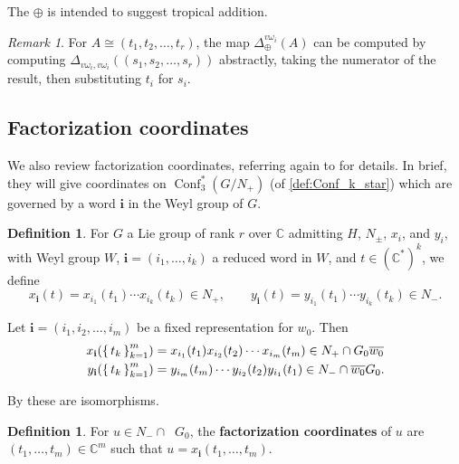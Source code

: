 \documentclass{amsart}
\theoremstyle{plain}
\theoremstyle{definition}
\newtheorem{definition}[theorem]{Definition}
\theoremstyle{remark}
\newtheorem{remark}[theorem]{Remark}
\newcommand{\defined}[1]{\textbf{#1}}
\newcommand{\fundamentalweight}{\omega}
\newcommand{\genminornumerator}[2]{\Delta_{\oplus}^{{#1} {#2}}}
\newcommand{\genminoryz}[3]{\Delta_{{#1} \fundamentalweight_{#3}, {#2}%
    \fundamentalweight_{#3}}}
\newcommand{\lifttoG}[1]{{\mathop{\overline{#1}}}}
\newcommand{\word}[1]{\mathbf{#1}}
\DeclareMathOperator{\Conf}{Conf}
\begin{document}
  The $\oplus$ is intended to suggest tropical addition.

  \begin{remark}
    \label{rem:numerator-calculation}
    For $A \cong (t_1, t_2, \dotsc, t_r)$, the map
    $\genminornumerator{v}{\fundamentalweight_i}(A)$ can be computed by
    computing $\genminoryz{v}{v}{i}((s_1, s_2, \dotsc, s_r))$
    abstractly, taking the numerator of the result, then substituting
    $t_i$ for $s_i$.
  \end{remark}

  \subsection{Factorization coordinates}

  \label{sec:factorization-coordinates}

  We also review factorization coordinates, referring again to
  \cite{fominzelevinsky1999} for details. In brief, they will give
  coordinates on $\Conf_3^{\ast}(G/N_{+})$ (of \cref{def:Conf_k_star})
  which are governed by a word $\word{i}$ in the Weyl group of $G$.

  \begin{definition}
    \label{def:factorization-coords-xi}
    For $G$ a Lie group of rank $r$ over $\mathbb{C}$ admitting $H$,
    $N_{\pm}$, $x_i$, and $y_i$, with Weyl group $W$, $\word{i} = (i_1,
    \dotsc, i_k)$ a reduced word in $W$, and $t \in
    (\mathbb{C}^{\ast})^k$, we define \[ x_{\word{i}}(t) = x_{i_1}(t_1)
      \dotsb x_{i_k}(t_k) \in N_{+}, \qquad y_{\word{i}}(t) =
      y_{i_1}(t_1) \dotsb y_{i_k}(t_k) \in N_{-}. \]

    Let $\word{i} = (i_1, i_2, \dotsc, i_m)$ be a fixed representation
    for $w_0$. Then
    \begin{align*}
      x_{\word{i}}(\set{t_k}_{k=1}^{m}) &= x_{i_1}(t_1) x_{i_2}(t_2) \dotsb x_{i_m}(t_m) \in N_{+} \cap G_0 \lifttoG{w_0} \\
      y_{\word{i}}(\set{t_k}_{k=1}^{m}) &= y_{i_m}(t_m) \dotsb y_{i_2}(t_2) y_{i_1}(t_1) \in N_{-} \cap \lifttoG{w_0} G_0.
    \end{align*}
  \end{definition}

  By \cite[Theorem~1.3]{fominzelevinsky1999} these are isomorphisms.

  \begin{definition}
    For $u \in N_{-} \cap \lifttoG{w_0} G_0$, the \defined{factorization
      coordinates} of $u$ are $(t_1, \dotsc, t_m) \in \mathbb{C}^m$ such
    that $u = x_{\word{i}}(t_1, \dotsc, t_m)$.
  \end{definition}
\end{document}
